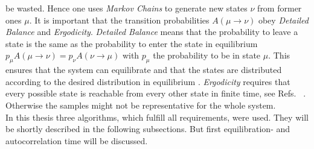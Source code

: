     be wasted.
    Hence one uses \emph{Markov Chains} to generate new states \(\nu\)
    from former ones \(\mu\). It is important that the transition probabilities
    \(A(\mu \to \nu)\) obey \emph{Detailed Balance} and \emph{Ergodicity}.
    \emph{Detailed Balance} means that the probability to leave a state is
    the same as the probability to enter the state in equilibrium
    \(p_\mu A(\mu \to \nu) = p_\nu A(\nu \to \mu)\) with \(p_\mu\) the
    probability to be in state \(\mu\). This ensures that the system can
    equilibrate and that the states are distributed according to the
    desired distribution in equilibrium \cite{NewmanBarkema1999}.
    \emph{Ergodicity} requires that every possible state is reachable
    from every other state in finite time, see Refs.\ \cite{NewmanBarkema1999} \cite{Katzgraber2011}.
    Otherwise the samples might not be representative for the whole system.\\
    In this thesis three algorithms, which fulfill all requirements,
    were used. They will be shortly described in the following subsections.
    But first equilibration- and autocorrelation time will be discussed.


